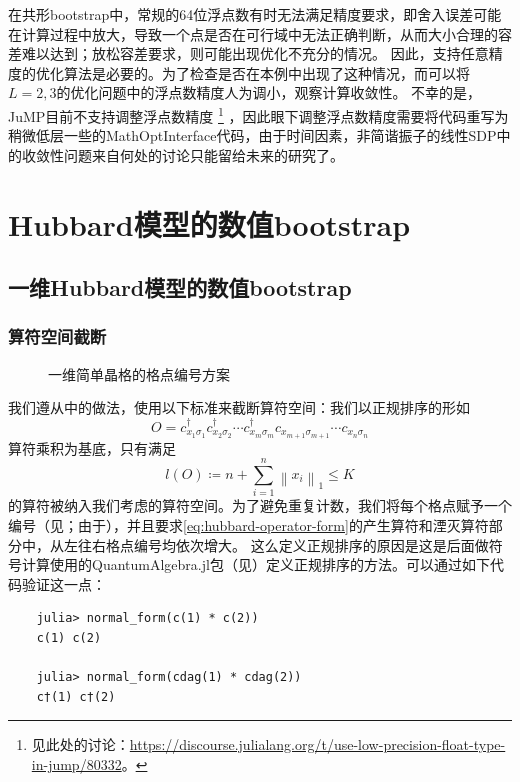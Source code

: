 \documentclass[oneside]{fduthesis}
\begin{document}
在共形bootstrap中，常规的64位浮点数有时无法满足精度要求，即舍入误差可能在计算过程中放大，导致一个点是否在可行域中无法正确判断，从而大小合理的容差难以达到；放松容差要求，则可能出现优化不充分的情况。
因此，支持任意精度的优化算法是必要的\cite{conformal-sdp}。为了检查是否在本例中出现了这种情况，而可以将$L=2, 3$的优化问题中的浮点数精度人为调小，观察计算收敛性。
不幸的是，JuMP目前不支持调整浮点数精度%
\footnote{见此处的讨论：\url{https://discourse.julialang.org/t/use-low-precision-float-type-in-jump/80332}。}%
，因此眼下调整浮点数精度需要将代码重写为稍微低层一些的MathOptInterface\cite{legat2021mathoptinterface}代码，由于时间因素，非简谐振子的线性SDP中的收敛性问题来自何处的讨论只能留给未来的研究了。

\chapter{Hubbard模型的数值bootstrap}

\section{一维Hubbard模型的数值bootstrap}

\subsection{算符空间截断}

\begin{figure}
    \centering
    
    \caption{一维简单晶格的格点编号方案}
    \label{fig:1d-lattice-index}
\end{figure}

我们遵从\parencite{han_manybody}中的做法，使用以下标准来截断算符空间：我们以正规排序的形如
\begin{equation}
    O = c^\dagger_{{x}_1 \sigma_1} c^\dagger_{x_2 \sigma_2} \cdots c^\dagger_{x_m \sigma_m} c_{x_{m+1} \sigma_{m+1}} \cdots c_{x_{n} \sigma_n}
    \label{eq:hubbard-operator-form}
\end{equation}
算符乘积为基底，只有满足
\begin{equation}
    l(O) \coloneqq n + \sum_{i=1}^n \left\| x_{i} \right\|_1 \leq K
    \label{eq:operator-space-criteria}
\end{equation}
的算符被纳入我们考虑的算符空间。为了避免重复计数，我们将每个格点赋予一个编号（见；由于），并且要求\eqref{eq:hubbard-operator-form}的产生算符和湮灭算符部分中，从左往右格点编号均依次增大。
这么定义正规排序的原因是这是后面做符号计算使用的QuantumAlgebra.jl包（见）定义正规排序的方法。可以通过如下代码验证这一点：
\begin{verbatim}
    julia> normal_form(c(1) * c(2))
    c(1) c(2)

    julia> normal_form(cdag(1) * cdag(2))
    c†(1) c†(2)
\end{verbatim}
\end{document}
